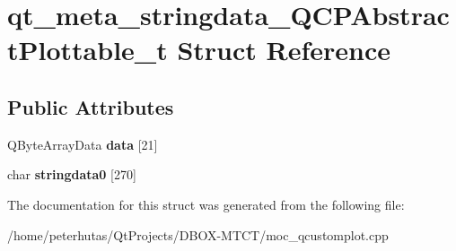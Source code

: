 \hypertarget{structqt__meta__stringdata___q_c_p_abstract_plottable__t}{}\section{qt\+\_\+meta\+\_\+stringdata\+\_\+\+Q\+C\+P\+Abstract\+Plottable\+\_\+t Struct Reference}
\label{structqt__meta__stringdata___q_c_p_abstract_plottable__t}
\subsection*{Public Attributes}
\begin{DoxyCompactItemize}
\item 
\mbox{\label{structqt__meta__stringdata___q_c_p_abstract_plottable__t_aaf0620f4cc407349bff54eddf41fef33}} 
Q\+Byte\+Array\+Data {\bfseries data} \mbox{[}21\mbox{]}
\item 
\mbox{\label{structqt__meta__stringdata___q_c_p_abstract_plottable__t_a397cb51ceb93b62e1fb7a828768255e4}} 
char {\bfseries stringdata0} \mbox{[}270\mbox{]}
\end{DoxyCompactItemize}


The documentation for this struct was generated from the following file\+:\begin{DoxyCompactItemize}
\item 
/home/peterhutas/\+Qt\+Projects/\+D\+B\+O\+X-\/\+M\+T\+C\+T/moc\+\_\+qcustomplot.\+cpp\end{DoxyCompactItemize}
